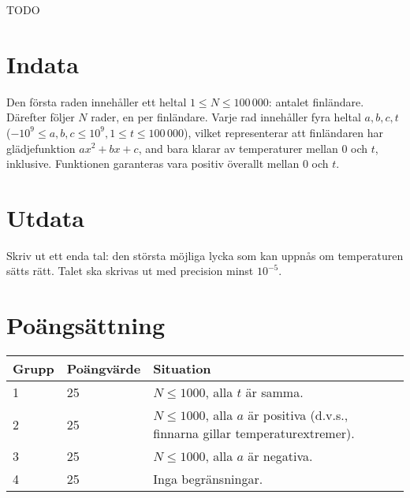 TODO

\section*{Indata}
Den första raden innehåller ett heltal $1 \le N \le 100\,000$: antalet finländare.
Därefter följer $N$ rader, en per finländare.
Varje rad innehåller fyra heltal $a, b, c, t$ ($-10^9 \le a,b,c \le 10^9, 1 \le t \le 100\,000$), vilket representerar att finländaren har glädjefunktion $ax^2 + bx + c$, and bara klarar av temperaturer mellan $0$ och $t$, inklusive.
Funktionen garanteras vara positiv överallt mellan $0$ och $t$.

\section*{Utdata}
Skriv ut ett enda tal: den största möjliga lycka som kan uppnås om temperaturen sätts rätt.
Talet ska skrivas ut med precision minst $10^{-5}$.

\section*{Poängsättning}
\begin{tabular}{| l | l | l |}
\hline
Grupp & Poängvärde & Situation \\ \hline
1     & 25         & $N \le 1000$, alla $t$ är samma. \\ \hline
2     & 25         & $N \le 1000$, alla $a$ är positiva (d.v.s., finnarna gillar temperaturextremer). \\ \hline
3     & 25         & $N \le 1000$, alla $a$ är negativa. \\ \hline
4     & 25         & Inga begränsningar. \\ \hline
\end{tabular}

